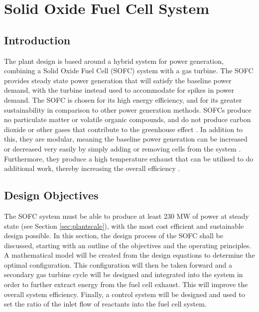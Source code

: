 



%

\section{Solid Oxide Fuel Cell System}


\subsection{Introduction}
The plant design is based around a hybrid system for power generation, combining a Solid Oxide Fuel Cell (SOFC) system with a gas turbine. The SOFC provides steady state power generation that will satisfy the baseline power demand, with the turbine instead used to accommodate for spikes in power demand. The SOFC is chosen for its high energy efficiency, and for its greater sustainability in comparison to other power generation methods. SOFCs produce no particulate matter or volatile organic compounds, and do not produce carbon dioxide or other gases that contribute to the greenhouse effect \cite{LM2}. In addition to this, they are modular, meaning the baseline power generation can be increased or decreased very easily by simply adding or removing cells from the system \cite{PR2}. Furthermore, they produce a high temperature exhaust that can be utilised to do additional work, thereby increasing the overall efficiency \cite{LM3}.


\subsection{Design Objectives}
The SOFC system must be able to produce at least 230 MW of power at steady state (see Section \ref{sec:plantscale}), with the most cost efficient and sustainable design possible. 
In this section, the design process of the SOFC shall be discussed, starting with an outline of the objectives and the operating principles. A mathematical model will be created from the design equations to determine the optimal configuration. This configuration will then be taken forward and a secondary gas turbine cycle will be designed and integrated into the system in order to further extract energy from the fuel cell exhaust. This will improve the overall system efficiency. Finally, a control system will be designed and used to set the ratio of the inlet flow of reactants into the fuel cell system.


